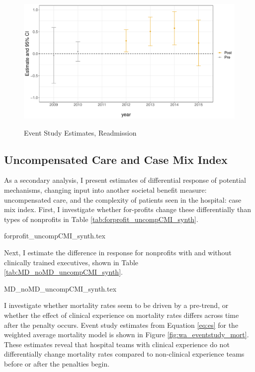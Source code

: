 \documentclass[12pt]{article}
\begin{document}
    \begin{figure}[ht!]
        \caption{Event Study Estimates, Readmission}
        \includegraphics[scale=.5]{Objects/read_es_graph.pdf}
        \label{fig:wa_eventstudy}
    \end{figure}


    \subsection{Uncompensated Care and Case Mix Index}

    As a secondary analysis, I present estimates of differential response of potential mechanisms, changing input into another societal benefit measure: uncompensated care, and the complexity of patients seen in the hospital: case mix index. First, I investigate whether for-profits change these differentially than types of nonprofits in Table \ref{tab:forprofit_uncompCMI_synth}. 

    {forprofit_uncompCMI_synth.tex}

    Next, I estimate the difference in response for nonprofits with and without clinically trained executives, shown in Table \ref{tab:MD_noMD_uncompCMI_synth}. 

    {MD_noMD_uncompCMI_synth.tex}


    I investigate whether mortality rates seem to be driven by a pre-trend, or whether the effect of clinical experience on mortality rates differs across time after the penalty occurs. Event study estimates from Equation \ref{eq:es} for the weighted average mortality model is shown in Figure \ref{fig:wa_eventstudy_mort}. These estimates reveal that hospital teams with clinical experience do not differentially change mortality rates compared to non-clinical experience teams before or after the penalties begin. 
\end{document}
